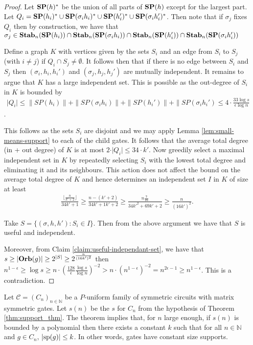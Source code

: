 \documentclass[../paper.tex]{subfiles}
\begin{document}
\begin{proof}
  Let $\text{\textbf{SP}} (h)^*$ be the union of all parts of $\text{\textbf{SP}}(h)$ except for the largest
  part. Let $Q_i = \text{\textbf{SP}}(h_i)^* \cup \text{\textbf{SP}}(\sigma_i h_i)^* \cup \text{\textbf{SP}} (h_i')^* \cup
  \text{\textbf{SP}} (\sigma_i h_i')^*$. Then note that if $\sigma_j$ fixes $Q_i$ then by
  construction, we have that $\sigma_j \in \text{\textbf{Stab}}_n(\text{\textbf{SP}}(h_i)) \cap
  \text{\textbf{Stab}}_n(\text{\textbf{SP}}(\sigma_i h_i)) \cap \text{\textbf{Stab}}_n(\text{\textbf{SP}}(h_i')) \cap \text{\textbf{Stab}}_n(\text{\textbf{SP}}(\sigma_i
  h_i'))$

  Define a graph $K$ with vertices given by the sets $S_i$ and an edge from
  $S_i$ to $S_j$ (with $i \neq j$) if $Q_i \cap S_j \neq \emptyset$. It follows
  then that if there is no edge between $S_i$ and $S_j$ then $(\sigma_i, h_i,
  h_i')$ and $(\sigma_j, h_j, h_j')$ are mutually independent. It remains to
  argue that $K$ has a large independent set. This is possible as the out-degree
  of $S_i$ in $K$ is bounded by
  \begin{align*}
    \vert Q_i \vert \leq \|SP(h_i) \| + \|SP(\sigma_i h_i) \| + \|SP(h_i') \| + \|SP(\sigma_i h_i') \leq 4 \cdot \frac{33\log s}{\epsilon \log n}
  \end{align*}. 

  This follows as the sets $S_i$ are disjoint and we may apply Lemma
  \ref{lem:small-means-support} to each of the child gates. It follows that the
  average total degree (in + out degree) of $K$ is at most $2 \cdot \vert Q_i
  \vert \leq 34 \cdot k'$. Now greedily select a maximal independent set in $K$
  by repeatedly selecting $S_i$ with the lowest total degree and eliminating it
  and its neighbours. This action does not affect the bound on the average total
  degree of $K$ and hence determines an independent set $I$ in $K$ of size at
  least
  \begin{align*}
    \frac{\lfloor \frac{n}{k' + 2} \rfloor}{34k' + 1} \geq \frac{n - (k'+2)}{34k'+1k'+2} \geq \frac{n\frac{7}{16}}{34k'^2 + 69k' +2} \geq \frac{n}{(16k')^2}.
  \end{align*}

  Take $S = \{(\sigma, h, h') : S_i \in I \}$. Then from the above argument we
  have that $S$ is useful and independent.
  
  Moreover, from Claim \ref{claim:useful-independant-set}, we have that $s \geq
  \vert \text{\textbf{Orb}}(g) \vert \geq 2^{\vert S \vert} \geq 2^{\frac{n}{(16k')^2}}$ then
  $n^{1-\epsilon} \geq \log s \geq n \cdot (\frac{128}{\epsilon}\frac{\log
    s}{\log n})^{-2} > n \cdot (n^{1-\epsilon})^{-2} = n^{2\epsilon -1} \geq
  n^{1-\epsilon}$. This is a contradiction.
\end{proof}

Let $\mathcal{C} = (C_n)_{n \in \mathbb{N}}$ be a $P$-uniform family of
symmetric circuits with matrix symmetric gates. Let $s(n)$ be the $s$ for $C_n$
from the hypothesis of Theorem \ref{thm:support_thm}. The theorem implies that,
for $n$ large enough, if $s(n)$ is bounded by a polynomial then there exists
a constant $k$ such that for all $n \in \mathbb{N}$ and $g \in C_n$, $\vert
\text{sp}(g) \vert \leq k$. In other words, gates have constant size supports.
\end{document}
